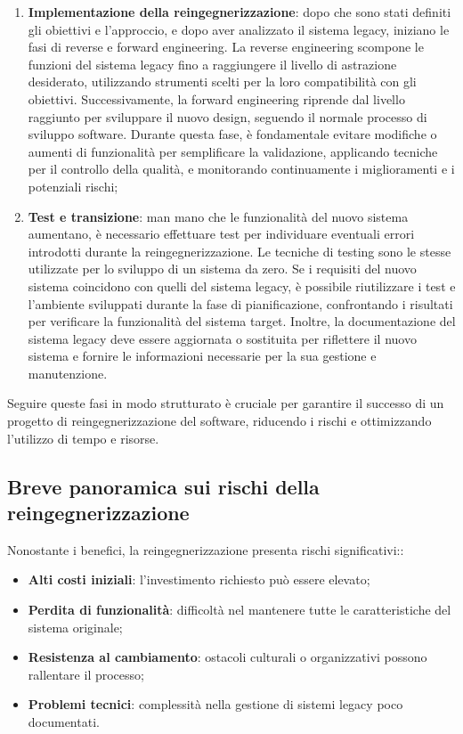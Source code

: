 \begin{enumerate}
  \item \textbf{Implementazione della reingegnerizzazione}: dopo che sono stati definiti gli obiettivi e l'approccio, e dopo aver analizzato il sistema legacy, iniziano le fasi di reverse e forward engineering. La reverse engineering scompone le funzioni del sistema legacy fino a raggiungere il livello di astrazione desiderato, utilizzando strumenti scelti per la loro compatibilità con gli obiettivi. Successivamente, la forward engineering riprende dal livello raggiunto per sviluppare il nuovo design, seguendo il normale processo di sviluppo software. Durante questa fase, è fondamentale evitare modifiche o aumenti di funzionalità per semplificare la validazione, applicando tecniche per il controllo della qualità, e monitorando continuamente i miglioramenti e i potenziali rischi;

  \item \textbf{Test e transizione}: man mano che le funzionalità del nuovo sistema aumentano, è necessario effettuare test per individuare eventuali errori introdotti durante la reingegnerizzazione. Le tecniche di testing sono le stesse utilizzate per lo sviluppo di un sistema da zero. Se i requisiti del nuovo sistema coincidono con quelli del sistema legacy, è possibile riutilizzare i test e l'ambiente sviluppati durante la fase di pianificazione, confrontando i risultati per verificare la funzionalità del sistema target. Inoltre, la documentazione del sistema legacy deve essere aggiornata o sostituita per riflettere il nuovo sistema e fornire le informazioni necessarie per la sua gestione e manutenzione.
\end{enumerate}

Seguire queste fasi in modo strutturato è cruciale per garantire il successo di un progetto di reingegnerizzazione del software, riducendo i rischi e ottimizzando l'utilizzo di tempo e risorse.

\subsection{Breve panoramica sui rischi della reingegnerizzazione}
Nonostante i benefici, la reingegnerizzazione presenta rischi significativi:\cite{Majthoub2018}:
\begin{itemize}
  \item \textbf{Alti costi iniziali}: l'investimento richiesto può essere elevato;
  \item \textbf{Perdita di funzionalità}: difficoltà nel mantenere tutte le caratteristiche del sistema originale;
  \item \textbf{Resistenza al cambiamento}: ostacoli culturali o organizzativi possono rallentare il processo;
  \item \textbf{Problemi tecnici}: complessità nella gestione di sistemi legacy poco documentati.
\end{itemize}
